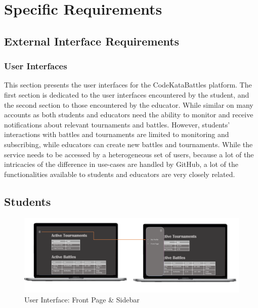 \clearpage
\newpage
\section{Specific Requirements}
\label{sec:reqs}

\subsection{External Interface Requirements}
\subsubsection{User Interfaces}
This section presents the user interfaces for the CodeKataBattles platform. The first section is dedicated to the user interfaces encountered by the student, and the second section to those encountered by the educator. While similar on many accounts as both students and educators need the ability to monitor and receive notifications about relevant tournaments and battles. However, students' interactions with battles and tournaments are limited to monitoring and subscribing, while educators can create new battles and tournaments. While the service needs to be accessed by a heterogeneous set of users, because a lot of the intricacies of the difference in use-cases are handled by GitHub, a lot of the functionalities available to students and educators are very closely related. 

\newpage
\clearpage
\subsection{Students}

\begin{figure}[Htbp!]
    \centering
    \includegraphics[width=\textwidth]{Graphics/SIDE BAR.png}
    \caption{User Interface: Front Page \& Sidebar}
    \label{fig:Sidebar}
\end{figure}

